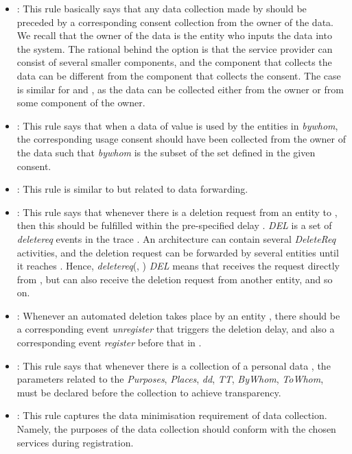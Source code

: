\documentclass[a4paper]{article}
\begin{document}
\begin{itemize}

\item : This rule basically says that any data collection made by  should be preceded by a corresponding consent collection from the owner of the data. We recall that the owner of the data is the entity who inputs the data into the system. The rational behind the option    is that the service provider can consist of several smaller components, and the component that collects the data can be different from the component that collects the consent. The case is similar for  and , as the data can be collected either from the owner or from some component of the owner.  

\item : This rule says that when a data of value  is used by the entities in \textit{bywhom}, the corresponding usage consent should have been collected from the owner of the data such that \textit{bywhom} is the subset of the set defined in the given consent. 

\item : This rule is similar to  but related to data forwarding.  

\item : This rule says that whenever there is a deletion request from an entity  to , then this should be fulfilled within the pre-specified delay .  \textit{DEL} is a set of \textit{deletereq} events in the trace . An architecture can contain several \textit{DeleteReq} activities, and the deletion request can be forwarded by several entities until it reaches . Hence, \textit{deletereq}(, )  \textit{DEL} means that  receives the request directly from , but  can also receive the deletion request from  another entity, and so on.

\item :  Whenever an automated deletion takes place by an entity , there should be a corresponding event \textit{unregister} that triggers the deletion delay, and  
also a corresponding event \textit{register} before that in .

\item :  This rule says that whenever there is a collection of a personal data , the parameters related to the \textit{Purposes}, \textit{Places}, \textit{dd}, \textit{TT}, \textit{ByWhom}, \textit{ToWhom}, must be declared before the collection to achieve transparency.       

\item :  This rule captures the data minimisation requirement of data collection. Namely, the purposes of the data collection should conform with the chosen services during registration. 
\end{itemize}  
\end{document}
